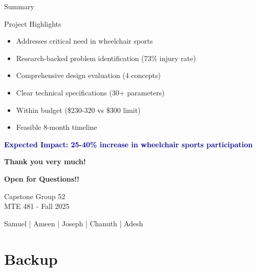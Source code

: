 \documentclass[aspectratio=169]{beamer}
\begin{document}
\begin{frame}{Summary}
\begin{block}{Project Highlights}
\begin{itemize}
    \item Addresses critical need in wheelchair sports
    \item Research-backed problem identification (73\% injury rate)
    \item Comprehensive design evaluation (4 concepts)
    \item Clear technical specifications (30+ parameters)
    \item Within budget (\$230-320 vs \$300 limit)
    \item Feasible 8-month timeline
\end{itemize}
\end{block}

\vspace{0.3cm}
\begin{center}
\Large \textcolor{darkblue}{\textbf{Expected Impact: 25-40\% increase in wheelchair sports participation}}
\end{center}
\end{frame}

\begin{frame}[plain]
\begin{center}
\Huge \textbf{Thank you very much!}

\vspace{1cm}
\Large \textbf{Open for Questions!!}

\vspace{1.5cm}
\Large Capstone Group 52\\
MTE 481 - Fall 2025

\vspace{0.5cm}
\normalsize
Samuel | Ameen | Joseph | Chanuth | Adesh
\end{center}
\end{frame}

\section*{Backup}
\end{document}
